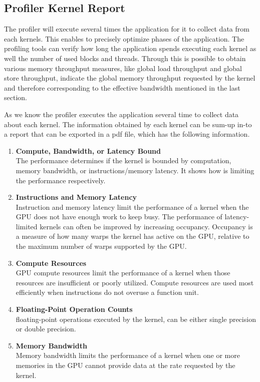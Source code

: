 \subsection{Profiler Kernel Report}

The profiler will execute several times the application for it to collect data from each kernels. This enables to precisely optimize phases of the application\cite{example}. The profiling tools can verify how long the application spends executing each kernel as well the number of used blocks and threads. Through this is possible to obtain various memory throughput measures, like global load throughput and global store throughput, indicate the global memory throughput requested by the kernel and therefore corresponding to the effective bandwidth mentioned in the last section.

As we know the profiler executes the application several time to collect data about each kernel. The information obtained by each kernel can be sum-up in-to a report that can be exported in a pdf file, which has the following information.

\begin{enumerate}
  \item \textbf{Compute, Bandwidth, or Latency Bound} \hfill \\
      The performance determines if the kernel is bounded by computation, memory bandwidth, or instructions/memory latency. It shows how is limiting the performance respectively.
  
  \item \textbf{Instructions and Memory Latency} \hfill \\
Instruction and memory latency limit the performance of a kernel when the GPU does not have enough work to keep busy. The performance of latency-limited kernels can often be improved by increasing occupancy. Occupancy is a measure of how many warps the kernel has active on the GPU, relative to the maximum number of warps supported by the GPU.
  
  \item \textbf{Compute Resources} \hfill \\
GPU compute resources limit the performance of a kernel when those resources are insufficient or poorly utilized. Compute resources are used most efficiently when instructions do not overuse a function unit. 
  \item \textbf{Floating-Point Operation Counts} \hfill \\
  floating-point operations executed by the kernel, can be either single precision or double precision.
  
  \item \textbf{Memory Bandwidth} \hfill \\
  Memory bandwidth limits the performance of a kernel when one or more memories in the GPU cannot provide data at the rate requested by the kernel.
\end{enumerate}

